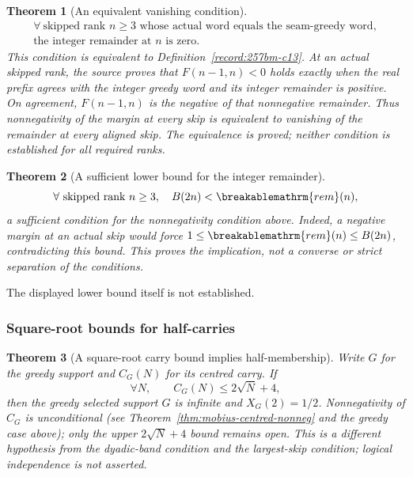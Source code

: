 \documentclass[11pt]{article}
\theoremstyle{plain}
\newtheorem{thm}{Theorem}[section]
\theoremstyle{definition}
\theoremstyle{remark}
\renewcommand{\mathrm}[1]{\ifmmode\breakablemathrm{#1}\else\textrm{#1}\fi}%
\begin{document}
\begin{thm}[An equivalent vanishing condition]\label{record:257bm-c14}
\[
\begin{gathered}
 \forall\ \text{skipped rank }n\ge3\text{ whose actual word equals the seam-greedy word},\\
 \text{the integer remainder at }n\text{ is zero}.
\end{gathered}
\]
This condition is equivalent to Definition~\ref{record:257bm-c13}.
At an actual skipped rank, the source proves that
$F(n-1,n)<0$ holds exactly when the real prefix agrees with the
integer greedy word and its integer remainder is positive.
On agreement, $F(n-1,n)$ is the negative of that nonnegative
remainder.  Thus nonnegativity of the margin at every skip is
equivalent to vanishing of the remainder at every aligned skip.
The equivalence is proved; neither condition is established for all
required ranks.
\end{thm}

\begin{thm}[A sufficient lower bound for the integer remainder]\label{record:257bm-c15}
\[
\forall\ \text{skipped rank }n\ge3,\quad B(2n) < \mathrm{rem}(n),
\]
a sufficient condition for the nonnegativity condition above.
Indeed, a negative margin at an actual skip would force
$1\le\mathrm{rem}(n)\le B(2n)$, contradicting this bound.
This proves the implication, not a converse or strict separation of the conditions.
\end{thm}
The displayed lower bound itself is not established.

\subsubsection*{Square-root bounds for half-carries}

\begin{thm}[A square-root carry bound implies half-membership]\label{record:257rig-c16}
Write $G$ for the greedy support and $C_G(N)$ for its centred carry. If
\[
\forall N,\qquad C_G(N) \le 2\sqrt N + 4,
\]
then the greedy selected support $G$ is infinite and $X_G(2)=1/2$.
Nonnegativity of $C_G$ is unconditional (see
Theorem~\ref{thm:mobius-centred-nonneg} and the greedy case above); only the upper
$2\sqrt N+4$ bound remains open. This is a different hypothesis from the dyadic-band
condition and the largest-skip condition; logical independence is not
asserted.
\end{thm}
\end{document}
